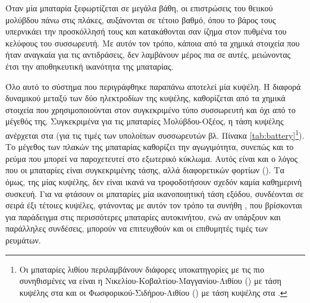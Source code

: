 \documentclass[12pt]{report}
\begin{document}
\begin{figure}[h]
				\center
				{}
				\captionsetup{width=0.8\textwidth}
				\label{eq:battery}
\end{figure}

Όταν μία μπαταρία ξεφωρτίζεται σε μεγάλα βάθη, οι επιστρώσεις του θειικού μολύβδου πάνω στις πλάκες, αυξάνονται σε τέτοιο βαθμό, όπου το βάρος τους υπερνικάει την προσκόλλησή τους και κατακάθονται σαν ίζημα στον πυθμένα του κελύφους
του συσσωρευτή. Με αυτόν τον τρόπο, κάποια από τα χημικά στοιχεία που ήταν αναγκαία για τις αντιδράσεις, δεν λαμβάνουν μέρος πια σε αυτές, μειώνοντας έτσι την αποθηκευτική ικανότητα της μπαταρίας.

Όλο αυτό το σύστημα που περιγράφθηκε παραπάνω αποτελεί μία κυψέλη. Η διαφορά δυναμικού μεταξύ των δύο ηλεκτροδίων της κυψέλης, καθορίζεται από τα χημικά στοιχεία που χρησιμοποιούνται στον συγκεκριμένο τύπο συσσωρευτή και όχι
από το μέγεθός της. Συγκεκριμένα για τις μπαταρίες Μολύβδου-Οξέος, η τάση κυψέλης ανέρχεται στα {} (για τις τιμές των υπολοίπων συσσωρευτών βλ. Πίνακα \ref{tab:battery}\footnote{Οι μπαταρίες λιθίου περιλαμβάνουν 
διάφορες υποκατηγορίες με τις πιο συνηθισμένες να είναι η Νικελίου-Κοβαλτίου-Μαγγανίου-Λιθίου ({}) με τάση κυψέλης στα {} και οι Φωσφορικού-Σιδήρου-Λιθίου ({}) με τάση κυψέλης στα 
{}.}). Το μέγεθος των πλακών της μπαταρίας καθορίζει την αγωγιμότητα, συνεπώς και το ρεύμα που μπορεί να παροχετευτεί στο εξωτερικό κύκλωμα. Αυτός είναι και ο λόγος που οι μπαταρίες είναι συγκεκριμένης τάσης, αλλά 
διαφορετικών φορτίων ({}). Τα {} όμως, της μίας κυψέλης, δεν είναι ικανά να τροφοδοτήσουν σχεδόν καμία καθημερινή συσκευή. Για να φτάσουν οι μπαταρίες μία ικανοποιητική τάση εξόδου, συνδέονται σε σειρά 
έξι τέτοιες κυψέλες, φτάνοντας με αυτόν τον τρόπο τα συνήθη {}, που βρίσκονται για παράδειγμα στις περισσότερες μπαταρίες αυτοκινήτου, ενώ αν υπάρξουν και παράλληλες συνδέσεις, μπορούν να επιτευχθούν και οι επιθυμητές
τιμές των ρευμάτων.
\end{document}
